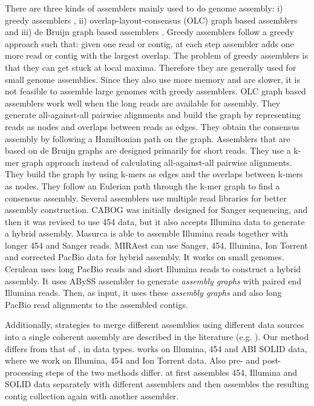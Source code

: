 \documentclass{llncs}
\begin{document}
There are three kinds of assemblers mainly used to do genome assembly: i) greedy assemblers \cite{ssake:2007,sharcgs:2007,vcake:2007}, ii) overlap-layout-consensus (OLC) graph based assemblers \cite{celera:2000, sga:2012, hapsemblerDonmez:2011} and iii) de Bruijn graph based assemblers \cite{eulerPevzner:2008, abyssSimpson:2009, velvetZerbino:2008, spadesBankevich:2012, allpaths:2008}. Greedy assemblers follow a greedy approach such that: given one read or contig, at each step assembler adds one more read or contig with the largest overlap. The problem of greedy assemblers is that they can get stuck at local maxima. Therefore they are generally used for small genome assemblies. Since they also use more memory and are slower, it is not feasible to assemble large genomes with greedy assemblers.
OLC graph based assemblers work well when the long reads are available for assembly. They generate all-against-all pairwise alignments and build the graph by representing reads as nodes and overlaps between reads as edges. 
They obtain the consensus assembly by following a Hamiltonian path on the graph. 
Assemblers that are based on de Bruijn graphs are designed primarily for short reads. 
They use a k-mer graph approach instead of calculating all-against-all pairwise alignments. They build the graph by using k-mers as edges and the overlaps between k-mers as nodes. They follow an Eulerian path through the k-mer graph to find a consensus assembly.
Several assemblers use multiple read libraries \cite{cabogMiller:2008, masurcaZimin:2013, miraest, cerulian:2013} for better assembly construction. CABOG \cite{cabogMiller:2008} was initially designed for Sanger sequencing, and then it was revised to use 454 data, but it also accepts Illumina data to 
generate a hybrid assembly. Masurca \cite{masurcaZimin:2013} is able to assemble Illumina reads   together with longer 454 and Sanger reads. MIRAest \cite{miraest} can use Sanger, 454, Illumina, Ion Torrent and corrected PacBio data for hybrid assembly. It works on small genomes. Cerulean \cite{cerulian:2013} uses long PacBio reads and short Illumina reads to construct a hybrid assembly. It uses ABySS \cite{abyssSimpson:2009} assembler to generate \textit{assembly graphs} with paired end Illumina reads. Then, as input, it uses these \textit{assembly graphs} and also long PacBio read alignments to the assembled contigs.

Additionally, strategies to merge different assemblies using different data sources into a single coherent assembly are described in the literature (e.g. \cite{wang:2012}). Our method differs from that of \cite{wang:2012}, in data types. \cite{wang:2012} works on Illumina, 454 and ABI SOLID data, where we work on Illumina, 454 and Ion Torrent data. Also pre- and post-processing steps of the two methods differ. \cite{wang:2012} at first assembles 454, Illumina and SOLID data separately with different assemblers and then assembles the resulting contig collection again with another assembler.
\end{document}
